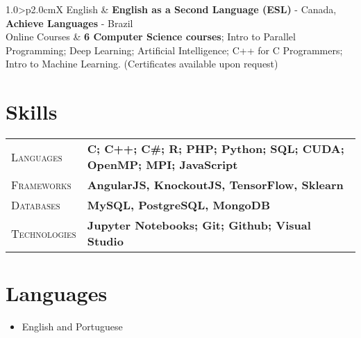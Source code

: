 \documentclass[9pt, a4paper, oneside, final]{scrartcl} %
\newcommand{\gray}{\rowcolor[gray]{.90}} %
\begin{document}
\begin{center}
\begin{tabularx}{1.0\linewidth}{>{\raggedleft\scshape}p{2.0cm}X}
\gray English & \textbf{English as a Second Language (ESL)} - Canada, 
          \textbf{Achieve Languages} - Brazil\\
\gray Online Courses & \textbf{6 Computer Science courses}; Intro to Parallel Programming; Deep Learning; Artificial Intelligence; C++ for C Programmers; Intro to Machine Learning. (Certificates available upon request)
\end{tabularx}
\end{center}


\section{Skills}

\begin{center}
\begin{tabularx}{1.0\linewidth}{>{\raggedleft\scshape}p{2.2cm}X}
\gray Languages & \textbf{C; C++; C\#; R; PHP; Python; SQL; CUDA; OpenMP; MPI; JavaScript}\\
\gray Frameworks & \textbf{AngularJS, KnockoutJS, TensorFlow, Sklearn}\\
\gray Databases & \textbf{MySQL, PostgreSQL, MongoDB}\\
\gray Technologies & \textbf{Jupyter Notebooks; Git; Github; Visual Studio}\\
\end{tabularx}
\end{center}


\section{Languages}

\begin{itemize} \itemsep1pt \parskip0pt 
  \item English and Portuguese 
\end{itemize}
\end{document}
